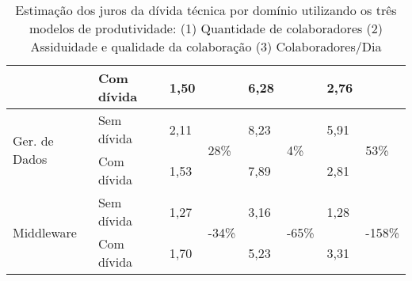 \begin{table}[H]
\begin{tabular}{|l|l|l|l|l|l|l|l|}
                               & Com dívida           & 1,50            &                        & 6,28            &                         & 2,76            &                         \\ \hline
\multirow{2}{*}{Ger. de Dados} & Sem dívida              & 2,11            & \multirow{2}{*}{28\%}  & 8,23            & \multirow{2}{*}{4\%}    & 5,91            & \multirow{2}{*}{53\%}   \\ \cline{2-3} \cline{5-5} \cline{7-7}
                               & Com dívida           & 1,53            &                        & 7,89            &                         & 2,81            &                         \\ \hline
\multirow{2}{*}{Middleware}    & Sem dívida              & 1,27            & \multirow{2}{*}{-34\%} & 3,16            & \multirow{2}{*}{-65\%}  & 1,28            & \multirow{2}{*}{-158\%} \\ \cline{2-3} \cline{5-5} \cline{7-7}
                               & Com dívida           & 1,70            &                        & 5,23            &                         & 3,31            &                         \\ \hline
\end{tabular}
\caption{Estimação dos juros da dívida técnica por domínio utilizando os três modelos de produtividade: (1) Quantidade de colaboradores (2) Assiduidade e qualidade da colaboração (3) Colaboradores/Dia}
\label{tab:estimacao_juros_dominio_analise}
\end{table}

